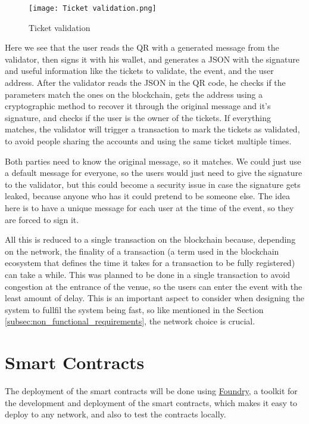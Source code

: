 \begin{figure}[H]
	\texttt{[image: Ticket validation.png]}
	\centering
	\caption{Ticket validation}
	\label{fig:ticket_validation}
\end{figure}

Here we see that the user reads the QR with a generated message from the
validator, then signs it with his wallet, and generates a JSON with the
signature and useful information like the tickets to validate, the event, and
the user address. After the validator reads the JSON in the QR code, he checks
if the parameters match the ones on the blockchain, gets the address using a
cryptographic method to recover it through the original message and it's
signature, and checks if the user is the owner of the tickets. If everything
matches, the validator will trigger a transaction to mark the tickets as
validated, to avoid people sharing the accounts and using the same ticket
multiple times.

Both parties need to know the original message, so it matches. We could just
use a default message for everyone, so the users would just need to give the
signature to the validator, but this could become a security issue in case the
signature gets leaked, because anyone who has it could pretend to be someone
else. The idea here is to have a unique message for each user at the time of
the event, so they are forced to sign it.

All this is reduced to a single transaction on the blockchain because,
depending on the network, the finality of a transaction (a term used in the
blockchain ecosystem that defines the time it takes for a transaction to be
fully registered) can take a while. This was planned to be done in a single
transaction to avoid congestion at the entrance of the venue, so the users can
enter the event with the least amount of delay. This is an important aspect to
consider when designing the system to fullfil the system being fast, so like
mentioned in the Section \ref{subsec:non_functional_requirements}, the network
choice is crucial.

\section{Smart Contracts}
\label{sec:smart_contracts}

The deployment of the smart contracts will be done using
\href{https://book.getfoundry.sh/}{Foundry}, a toolkit for the development and
deployment of the smart contracts, which makes it easy to deploy to any
network, and also to test the contracts locally.

